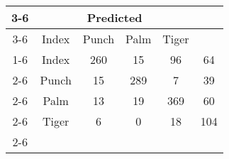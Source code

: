 \documentclass{standalone}
\begin{document}
 
 \begin{tabular}{|c |c |c |c |c |c |}
\cline{3-6}\multicolumn{2}{c|}{} & \multicolumn{4}{c|}{Predicted} \\ 
\cline{3-6} \multicolumn{2}{c |}{ } & Index & Punch & Palm & Tiger\\ 
\cline{1-6}\multirow{4}{*}{\rotatebox[origin=c]{90}{Actual}} & Index & 260 & 15 & 96 & 64\\ 
 \cline{2-6} & Punch & 15 & 289 & 7 & 39\\ 
 \cline{2-6} & Palm & 13 & 19 & 369 & 60\\ 
 \cline{2-6} & Tiger & 6 & 0 & 18 & 104\\ 
 \cline{2-6}\hline \end{tabular}
 
\end{document}
